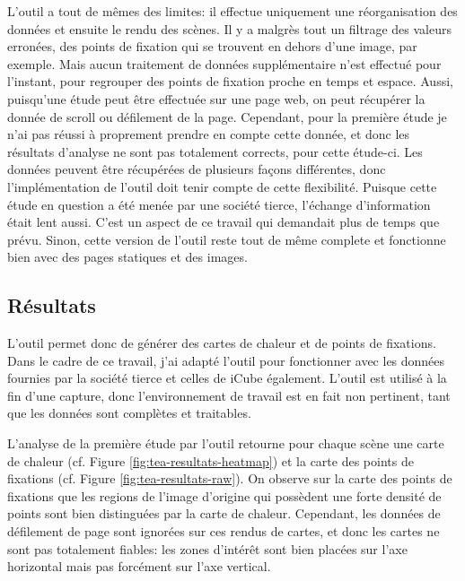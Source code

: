 \documentclass[hidelinks,12pt]{article}
\begin{document}
\bigskip
L'outil a tout de mêmes des limites: il effectue uniquement une réorganisation 
des données et ensuite le rendu des scènes. Il y a malgrès tout un filtrage  
des valeurs erronées, des points de fixation qui se trouvent en dehors d'une 
image, par exemple. Mais aucun traitement de données supplémentaire n'est 
effectué pour l'instant, pour regrouper des points de fixation proche en temps 
et espace. Aussi, puisqu'une étude peut être effectuée sur une page web, on 
peut récupérer la donnée de scroll ou défilement de la page. Cependant, pour la 
première étude je n'ai pas réussi à proprement prendre en compte cette donnée, 
et donc les résultats d'analyse ne sont pas totalement corrects, pour cette 
étude-ci. Les données peuvent être récupérées de plusieurs façons différentes, 
donc l'implémentation de l'outil doit tenir compte de cette flexibilité. 
Puisque cette étude en question a été menée par une société tierce, l'échange 
d'information était lent aussi. C'est un aspect de ce travail qui demandait 
plus de temps que prévu. Sinon, cette version de l'outil reste tout de même 
complete et fonctionne bien avec des pages statiques et des images.

\subsection{Résultats}

L'outil permet donc de générer des cartes de chaleur et de points de fixations.
Dans le cadre de ce travail, j'ai adapté l'outil pour fonctionner avec les
données fournies par la société tierce et celles de iCube également. L'outil est
utilisé à la fin d'une capture, donc l'environnement de travail est en fait non
pertinent, tant que les données sont complètes et traitables.

\bigskip
L'analyse de la première étude par l'outil retourne pour chaque scène une carte
de chaleur (cf. Figure \ref{fig:tea-resultats-heatmap}) et la carte des points
de fixations (cf. Figure \ref{fig:tea-resultats-raw}). On observe sur la carte
des points de fixations que les regions de l'image d'origine qui possèdent une
forte densité de points sont bien distinguées par la carte de chaleur.
Cependant, les données de défilement de page sont ignorées sur ces rendus de
cartes, et donc les cartes ne sont pas totalement fiables: les zones
d'intérêt sont bien placées sur l'axe horizontal mais pas forcément sur l'axe
vertical.
\end{document}
